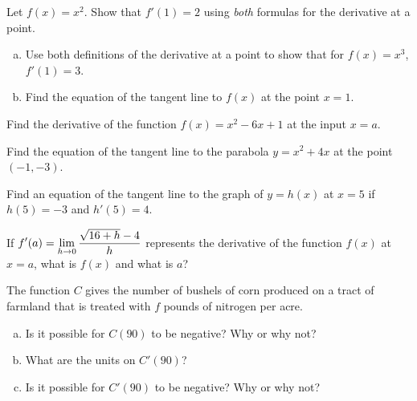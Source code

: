 \documentclass[notes]{subfiles}
\begin{document}
		\begin{ex}
			Let \(f(x) = x^2\).  Show that \(f'(1) = 2\) using \emph{both} formulas for the derivative at a point.
		\end{ex}
			\newpage
			
		\begin{ex}
			\begin{enumerate}[(a)]
				\item Use both definitions of the derivative at a point to show that for \(f(x) = x^3\), \(f'(1) = 3\).
					
				\item Find the equation of the tangent line to \(f(x)\) at the point \(x = 1\).
					
			\end{enumerate}
		\end{ex}
			
		\begin{ex}
			Find the derivative of the function \(f(x) = x^2-6x+1\) at the input \(x = a\).
		\end{ex}
			\vs{2}
			\newpage
			
		\begin{ex}
			Find the equation of the tangent line to the parabola \(y = x^2 + 4x\) at the point \((-1,-3)\).
		\end{ex}
			
		\begin{ex}
			Find an equation of the tangent line to the graph of \(y = h(x)\) at \(x = 5\) if \(h(5) = -3\) and \(h'(5) = 4\).
		\end{ex}
			\vs{1}
			
		\begin{ex}
			If \(\displaystyle f'(a) = \lim_{h\to 0} \dfrac{\sqrt{16 + h} - 4}{h}\) represents the derivative of the function \(f(x)\) at \(x = a\), what is \(f(x)\) and what is \(a\)?
		\end{ex}
			\vs{1}
			\newpage
			
		\begin{ex}
			The function \(C\) gives the number of bushels of corn produced on a tract of farmland that is treated with \(f\) pounds of nitrogen per acre.
			\begin{enumerate}[(a)]
				\item Is it possible for \(C(90)\) to be negative?  Why or why not?
					\vs{1}
					
				\item What are the units on \(C'(90)\)?
					\vs{.5}

				\item Is it possible for \(C'(90)\) to be negative?  Why or why not?
					\vs{1}
			\end{enumerate}
		\end{ex}
			
\end{document}
